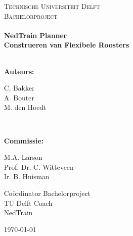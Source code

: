 
\usepackage{amsmath}
\usepackage{amssymb}
\usepackage{pdfpages}
\usepackage{rotating}
\usepackage{float}



\begin{titlepage}
\center
\textsc{Technische Universiteit Delft}\\[0.2cm]
\textsc{\Huge Bachelorproject}\\[1.5cm]
\HRule \\[0.4cm]
{\Huge \bfseries NedTrain Planner}\\[0.5cm]
{\LARGE \bfseries Construeren van Flexibele Roosters}\\[0.4cm]
\HRule \\[1.5cm]

\begin{large}
\raggedright
\textbf{Auteurs:}\\[0.1cm]
\begin{minipage}{\textwidth}
\flushleft
C. Bakker \\
A. Bouter \\
M. den Hoedt \\
\end{minipage}\\[1cm]
\raggedright
\textbf{Commissie:}\\[0.1cm]
\begin{minipage}{0.5\textwidth}
\flushleft
M.A. Larson \\
Prof. Dr. C. Witteveen \\
Ir. B. Huisman \\
\end{minipage}%
\begin{minipage}{0.5\textwidth}
\flushright
Co\"ordinator Bachelorproject\\
TU Delft Coach \\
NedTrain \\
\end{minipage}
\end{large}


\vfill
{\large \today}\\[2cm]


\end{titlepage}
